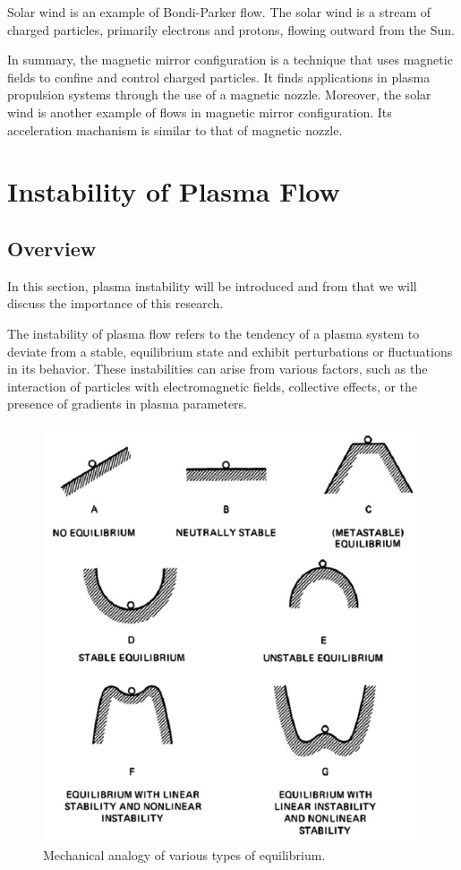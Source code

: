 Solar wind is an example of Bondi-Parker flow. The solar wind is a stream of charged particles, primarily electrons and protons, flowing outward from the Sun. 

In summary, the magnetic mirror configuration is a technique that uses magnetic fields to confine and control charged particles. It finds applications in plasma propulsion systems through the use of a magnetic nozzle. Moreover, the solar wind is another example of flows in magnetic mirror configuration. Its acceleration machanism is similar to that of magnetic nozzle. 

\section{Instability of Plasma Flow}
\subsection{Overview}
In this section, plasma instability will be introduced and from that we will discuss the importance of this research.

The instability of plasma flow refers to the tendency of a plasma system to deviate from a stable, equilibrium state and exhibit perturbations or fluctuations in its behavior. These instabilities can arise from various factors, such as the interaction of particles with electromagnetic fields, collective effects, or the presence of gradients in plasma parameters.

\begin{figure}[htbp]
	\centering
	\includegraphics[width=0.7\linewidth]{img/introduction/stability-visualization}
	\caption{Mechanical analogy of various types of equilibrium. \cite{chen_introduction_2016}}
	\label{fig:stability-visualization}
\end{figure}

